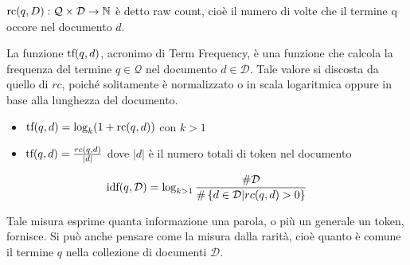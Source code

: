 \begin{definizione}\label{def:raw_count}
	$\text{rc}(q, D) : \mathcal{Q} \times \mathcal{D} \rightarrow \mathbb{N}$ è detto raw count, cioè il numero di volte che
	il termine q occore nel documento $d$.
\end{definizione}

\begin{definizione}\label{def:}
	La funzione $\text{tf}(q,d)$, acronimo di Term Frequency, è una funzione che calcola la frequenza del
	termine $q \in \mathcal{Q}$ nel documento $d \in \mathcal{D}$.
	Tale valore si discosta da quello di $rc$, poiché solitamente è normalizzato o in scala logaritmica
	oppure in base alla lunghezza del documento.
	
	\begin{itemize}
		\item $\text{tf}(q,d) = \log_{k}(1+\text{rc}(q,d))$ con $k>1$
		\item $\text{tf}(q,d) = \frac{rc(q,d)}{|d|}$ dove $|d|$ è il numero totali di token nel documento
	\end{itemize}
\end{definizione}

\begin{definizione}\label{def:idf}
	$$
	\text{idf}(q, \mathcal{D}) = \log_{k>1}{
		\frac{\#\mathcal{D}}{
			\#
			\left\{
			d \in \mathcal{D} \middle \lvert rc(q,d) > 0
			\right\} 
		}
	}
	$$
	
	Tale misura esprime quanta informazione una parola, o più un generale un token, fornisce.
	Si può anche pensare come la misura dalla rarità, cioè quanto è comune il termine $q$
	nella collezione di documenti $\mathcal{D}$.
\end{definizione}




